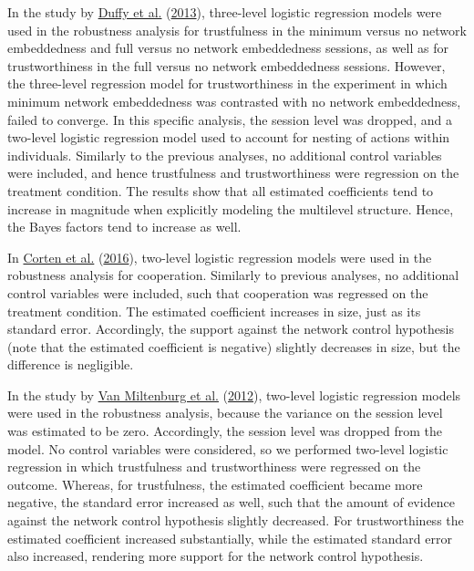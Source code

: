 \documentclass[
  11pt,
]{article}
\begin{document}
In the study by \protect\hyperlink{ref-duffy2013social}{Duffy et al.} (\protect\hyperlink{ref-duffy2013social}{2013}), three-level logistic regression models were used in the robustness analysis for trustfulness in the minimum versus no network embeddedness and full versus no network embeddedness sessions, as well as for trustworthiness in the full versus no network embeddedness sessions.
However, the three-level regression model for trustworthiness in the experiment in which minimum network embeddedness was contrasted with no network embeddedness, failed to converge.
In this specific analysis, the session level was dropped, and a two-level logistic regression model used to account for nesting of actions within individuals.
Similarly to the previous analyses, no additional control variables were included, and hence trustfulness and trustworthiness were regression on the treatment condition.
The results show that all estimated coefficients tend to increase in magnitude when explicitly modeling the multilevel structure.
Hence, the Bayes factors tend to increase as well.

In \protect\hyperlink{ref-corten_etal_reputation_2016}{Corten et al.} (\protect\hyperlink{ref-corten_etal_reputation_2016}{2016}), two-level logistic regression models were used in the robustness analysis for cooperation.
Similarly to previous analyses, no additional control variables were included, such that cooperation was regressed on the treatment condition.
The estimated coefficient increases in size, just as its standard error.
Accordingly, the support against the network control hypothesis (note that the estimated coefficient is negative) slightly decreases in size, but the difference is negligible.

In the study by \protect\hyperlink{ref-miltenburg_buskens_triads_2012}{Van Miltenburg et al.} (\protect\hyperlink{ref-miltenburg_buskens_triads_2012}{2012}), two-level logistic regression models were used in the robustness analysis, because the variance on the session level was estimated to be zero.
Accordingly, the session level was dropped from the model.
No control variables were considered, so we performed two-level logistic regression in which trustfulness and trustworthiness were regressed on the outcome.
Whereas, for trustfulness, the estimated coefficient became more negative, the standard error increased as well, such that the amount of evidence against the network control hypothesis slightly decreased.
For trustworthiness the estimated coefficient increased substantially, while the estimated standard error also increased, rendering more support for the network control hypothesis.
\end{document}
